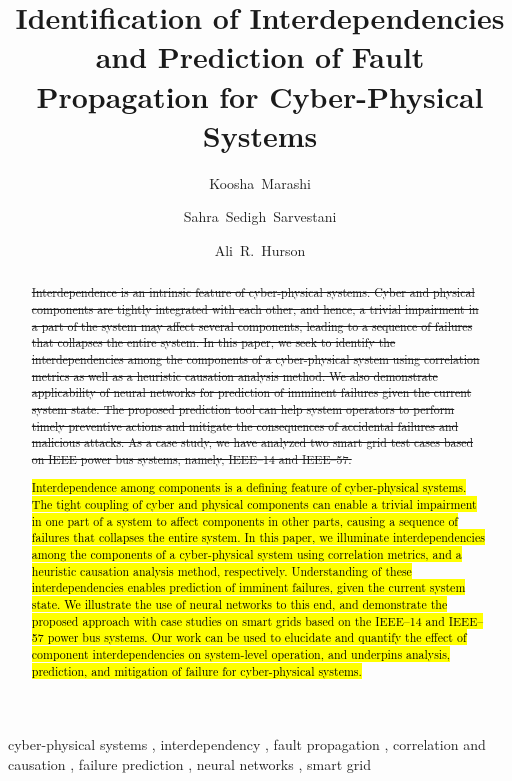 \documentclass[12pt]{elsarticle}
\begin{document}
\begin{frontmatter}

\title{Identification of Interdependencies and Prediction of Fault Propagation for Cyber-Physical Systems}

\author[romeo]{Koosha~Marashi}
\author[s_and_t]{Sahra~Sedigh~Sarvestani}
\author[s_and_t]{Ali~R.~Hurson}

\address[romeo]{Romeo Power Technology, Vernon, CA 90058, USA}
\address[s_and_t]{Missouri University of Science and Technology, Rolla, MO 65409, USA}

\begin{abstract}
\sout{Interdependence is an intrinsic feature of cyber-physical systems. Cyber and physical components are tightly integrated with each other, and hence, a trivial impairment in a part of the system may affect several components, leading to a sequence of failures that collapses the entire system. In this paper, we seek to identify the interdependencies among the components of a cyber-physical system using correlation metrics as well as a heuristic causation analysis method. We also demonstrate applicability of neural networks for prediction of imminent failures given the current system state. The proposed prediction tool can help system operators to perform timely preventive actions and mitigate the consequences of accidental failures and malicious attacks. As a case study, we have analyzed two smart grid test cases based on IEEE power bus systems, namely, IEEE--14 and IEEE--57.}
\vspace{1em}

\hl{Interdependence among components is a defining feature of cyber-physical systems. The tight coupling of cyber and physical components can enable a trivial impairment in one part of a system to affect components in other parts,  causing a sequence of failures that collapses the entire system. In this paper, we illuminate interdependencies among the components of a cyber-physical system using correlation metrics, and a heuristic causation analysis method, respectively. Understanding of these interdependencies enables prediction of imminent failures, given the current system state. We illustrate the use of neural networks to this end, and demonstrate the proposed approach with case studies on  smart grids based on the IEEE--14 and IEEE--57  power bus systems. Our work can be used to elucidate and quantify the effect of component interdependencies on system-level operation, and underpins analysis, prediction, and mitigation of failure for cyber-physical systems.}
\end{abstract}

\begin{keyword}
cyber-physical systems \sep
interdependency \sep
fault propagation \sep
correlation and causation \sep
failure prediction \sep
neural networks \sep
smart grid
\end{keyword}

\end{frontmatter}
\end{document}
